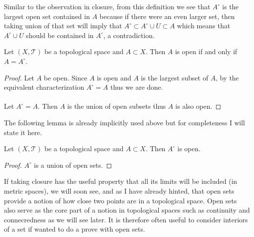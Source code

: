 Similar to the observation in closure, from this definition we see that $A^\circ$ is the largest open set contained in $A$ because if there were an even larger set, then taking union of that set will imply that $A^\circ\subset A^\circ\cup U\subset A$ which means that $A^\circ\cup U$ should be contained in $A^\circ$, a contradiction. 

\begin{prp}{}{} Let $(X,\mathcal{T})$ be a topological space and $A\subset X$. Then $A$ is open if and only if $A=A^\circ$. \tcbline
\begin{proof}
Let $A$ be open. Since $A$ is open and $A$ is the largest subset of $A$, by the equivalent characterization $A^\circ=A$ thus we are done. \\~\\
Let $A^\circ=A$. Then $A$ is the union of open subsets thus $A$ is also open. 
\end{proof}
\end{prp}

The following lemma is already implicitly used above but for completeness I will state it here. 

\begin{lmm}{}{} Let $(X,\mathcal{T})$ be a topological space and $A\subset X$. Then $A^\circ$ is open. \tcbline
\begin{proof}
$A^\circ$ is a union of open sets. 
\end{proof}
\end{lmm}

If taking closure has the useful property that all its limits will be included (in metric spaces), we will soon see, and as I have already hinted, that open sets provide a notion of how close two points are in a topological space. Open sets also serve as the core part of a notion in topological spaces such as continuity and connecredness as we will see later. It is therefore often useful to consider interiors of a set if wanted to do a prove with open sets. 

